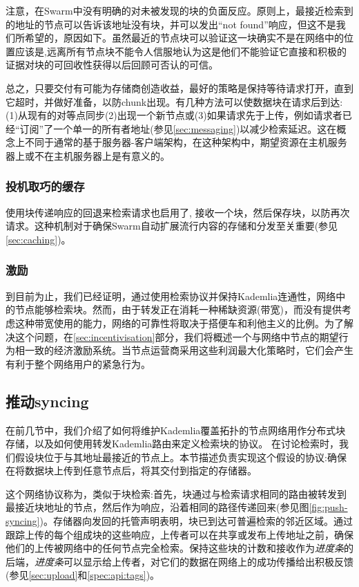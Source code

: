 注意，在Swarm中没有明确的对未被发现的块的负面反应。原则上，最接近检索到的地址的节点可以告诉该地址没有块，并可以发出“not found”响应，但这不是我们所希望的，原因如下。虽然最近的节点块可以验证这一块确实不是在网络中的位置应该是,远离所有节点块不能令人信服地认为这是他们不能验证它直接和积极的证据对块的可回收性获得以后回顾可否认的可信。

总之，只要交付有可能为存储商创造收益，最好的策略是保持等待请求打开，直到它超时，并做好准备，以防chunk出现。有几种方法可以使数据块在请求后到达:(1)从现有的对等点同步(2)出现一个新节点或(3)如果请求先于上传，例如请求者已经“订阅”了一个单一的所有者地址(参见\ref{sec:messaging})以减少检索延迟。这在概念上不同于通常的基于服务器-客户端架构，在这种架构中，期望资源在主机服务器上或不在主机服务器上是有意义的。 
 

\subsubsection{投机取巧的缓存}

使用块传递响应的回退来检索请求也启用了, 接收一个块，然后保存块，以防再次请求。这种机制对于确保Swarm自动扩展流行内容的存储和分发至关重要(参见\ref{sec:caching})。

\subsubsection{激励}

到目前为止，我们已经证明，通过使用检索协议并保持Kademlia连通性，网络中的节点能够检索块。然而，由于转发正在消耗一种稀缺资源(带宽)，而没有提供考虑这种带宽使用的能力，网络的可靠性将取决于搭便车和利他主义的比例。为了解决这个问题，在\ref{sec:incentivisation}部分，我们将概述一个与网络中节点的期望行为相一致的经济激励系统。当节点运营商采用这些利润最大化策略时，它们会产生有利于整个网络用户的紧急行为。
 
\subsection{推动syncing\statusgreen}\label{sec:push-syncing}
 
在前几节中，我们介绍了如何将维护Kademlia覆盖拓扑的节点网络用作分布式块存储，以及如何使用转发Kademlia路由来定义检索块的协议。
在讨论检索时，我们假设块位于与其地址最接近的节点上。本节描述负责实现这个假设的协议:确保在将数据块上传到任意节点后，将其交付到指定的存储器。

这个网络协议称为，类似于块检索:首先，块通过与检索请求相同的路由被转发到最接近块地址的节点，然后作为响应，沿着相同的路径传递回来(参见图\ref{fig:push-syncing})。存储器向发回的托管声明表明，块已到达可普遍检索的邻近区域。通过跟踪上传的每个组成块的这些响应，上传者可以在共享或发布上传地址之前，确保他们的上传被网络中的任何节点完全检索。保持这些块的计数和接收作为\emph{进度条}的后端，\emph{进度条}可以显示给上传者，对它们的数据在网络上的成功传播给出积极反馈(参见\ref{sec:upload}和\ref{spec:api:tags})。


